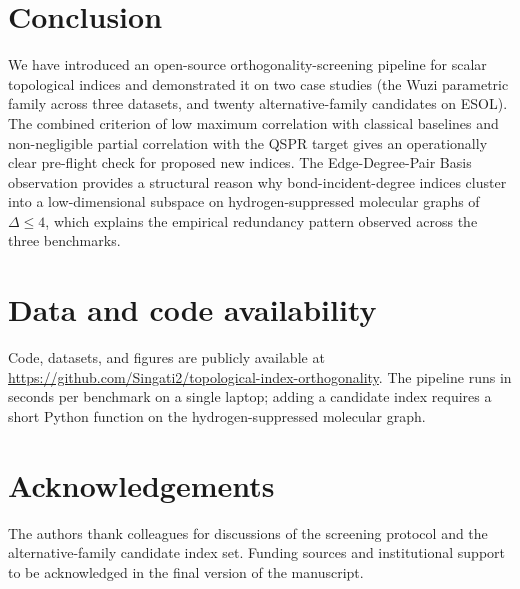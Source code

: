 \documentclass[11pt,a4paper]{article}
\theoremstyle{definition}
\begin{document}
\section{Conclusion}

We have introduced an open-source orthogonality-screening pipeline
for scalar topological indices and demonstrated it on two case
studies (the Wuzi parametric family across three datasets, and
twenty alternative-family candidates on ESOL). The combined
criterion of low maximum correlation with classical baselines and
non-negligible partial correlation with the QSPR target gives an
operationally clear pre-flight check for proposed new indices. The
Edge-Degree-Pair Basis observation provides a structural reason
why bond-incident-degree indices cluster into a low-dimensional
subspace on hydrogen-suppressed molecular graphs of $\Delta\le 4$,
which explains the empirical redundancy pattern observed across
the three benchmarks.

\section*{Data and code availability}

Code, datasets, and figures are publicly available at
\url{https://github.com/Singati2/topological-index-orthogonality}.
The pipeline runs in seconds per benchmark on a single laptop;
adding a candidate index requires a short Python function on the
hydrogen-suppressed molecular graph.

\section*{Acknowledgements}

The authors thank colleagues for discussions of the screening
protocol and the alternative-family candidate index set. Funding
sources and institutional support to be acknowledged in the final
version of the manuscript.
\end{document}
